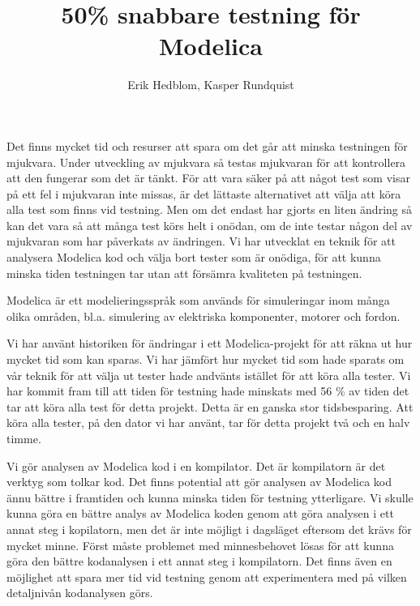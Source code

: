 \documentclass{popsci}
\author{Erik Hedblom, Kasper Rundquist}
\title{50\% snabbare testning för Modelica}
\begin{document}


{\noindent Det finns mycket tid och resurser att spara om det går att minska testningen för mjukvara. Under utveckling av mjukvara så testas mjukvaran för att kontrollera att den fungerar som det är tänkt. För att vara säker på att något test som visar på ett fel i mjukvaran inte missas, är det lättaste alternativet att välja att köra alla test som finns vid testning. Men om det endast har gjorts en liten ändring så kan det vara så att många test körs helt i onödan, om de inte testar någon del av mjukvaran som har påverkats av ändringen. Vi har utvecklat en teknik för att analysera Modelica kod och välja bort tester som är onödiga, för att kunna minska tiden testningen tar utan att försämra kvaliteten på testningen.

Modelica är ett modelieringsspråk som används för simuleringar inom många olika områden, bl.a. simulering av elektriska komponenter, motorer och fordon.

Vi har använt historiken för ändringar i ett Modelica-projekt för att räkna ut hur mycket tid som kan sparas. Vi har jämfört hur mycket tid som hade sparats om vår teknik för att välja ut tester hade andvänts istället för att köra alla tester. Vi har kommit fram till att tiden för testning hade minskats med 56 \% av tiden det tar att köra alla test för detta projekt. Detta är en ganska stor tidsbesparing. Att köra alla tester, på den dator vi har använt, tar för detta projekt två och en halv timme.

Vi gör analysen av Modelica kod i en kompilator. Det är kompilatorn är det verktyg som tolkar kod. Det finns potential att gör analysen av Modelica kod ännu bättre i framtiden och kunna minska tiden för testning ytterligare. Vi skulle kunna göra en bättre analys av Modelica koden genom att göra analysen i ett annat steg i kopilatorn, men det är inte möjligt i dagsläget eftersom det krävs för mycket minne. Först måste problemet med minnesbehovet lösas för att kunna göra den bättre kodanalysen i ett annat steg i kompilatorn. Det finns även en möjlighet att spara mer tid vid testning genom att experimentera med på vilken detaljnivån kodanalysen görs. 
}
\end{document}
